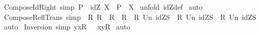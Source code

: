 \begin{isabellebody}
\isamarkupfalse%
%
\endisatagproof
{\isafoldproof}%
%
\isadelimproof
\isanewline
%
\endisadelimproof
\isanewline
\isanewline
{}\isamarkupfalse%
\ Compose{\isacharunderscore}Id{\isacharunderscore}Right\ {\isacharbrackleft}simp{\isacharbrackright}{\isacharcolon}\ {\isachardoublequoteopen}{\isacharparenleft}P\ {\isacharpercent}{\isacharsemicolon}\ idZ\ X{\isacharparenright}\ {\isacharequal}\ {\isacharparenleft}P\ {\isacharcolon}{\isachargreater}\ X{\isacharparenright}{\isachardoublequoteclose}\isanewline
%
\isadelimproof
%
\endisadelimproof
%
\isatagproof
{}\isamarkupfalse%
\ {\isacharparenleft}unfold\ idZ{\isacharunderscore}def{\isacharparenright}\isanewline
{}\isamarkupfalse%
\ auto\isanewline
{}\isamarkupfalse%
%
\endisatagproof
{\isafoldproof}%
%
\isadelimproof
\isanewline
%
\endisadelimproof
\isanewline
{}\isamarkupfalse%
\ Compose{\isacharunderscore}Refl{\isacharunderscore}Trans\ {\isacharbrackleft}simp{\isacharbrackright}{\isacharcolon}\ {\isachardoublequoteopen}{\isacharbang}{\isacharbang}\ R{\isachardot}\ {\isacharparenleft}R\ {\isacharpercent}{\isacharsemicolon}\ R{\isacharparenright}\ {\isacharless}{\isacharequal}\ R\ {\isacharequal}{\isacharequal}{\isachargreater}\ {\isacharparenleft}{\isacharparenleft}R\ Un\ idZ{\isacharparenleft}S{\isacharparenright}{\isacharparenright}\ {\isacharpercent}{\isacharsemicolon}\ {\isacharparenleft}R\ Un\ idZ{\isacharparenleft}S{\isacharparenright}{\isacharparenright}{\isacharparenright}\ {\isacharless}{\isacharequal}\ {\isacharparenleft}R\ Un\ idZ{\isacharparenleft}S{\isacharparenright}{\isacharparenright}{\isachardoublequoteclose}\isanewline
%
\isadelimproof
%
\endisadelimproof
%
\isatagproof
{}\isamarkupfalse%
\ auto\isanewline
{}\isamarkupfalse%
%
\endisatagproof
{\isafoldproof}%
%
\isadelimproof
%
\endisadelimproof
%
\isamarkuptrue%
\isamarkupfalse%
\ Inversion\ {\isacharbrackleft}simp{\isacharbrackright}{\isacharcolon}\ {\isachardoublequoteopen}{\isacharparenleft}y{\isacharcomma}x{\isacharparenright}{\isacharcolon}{\isacharparenleft}R\ {\isacharpercent}{\isachartilde}{\isacharparenright}\ {\isacharequal}\ {\isacharparenleft}{\isacharparenleft}x{\isacharcomma}y{\isacharparenright}{\isacharcolon}R{\isacharparenright}{\isachardoublequoteclose}\isanewline
%
\isadelimproof
%
\endisadelimproof
%
\isatagproof
{}\isamarkupfalse%
\ auto\isanewline
{}\isamarkupfalse%
%
\endisatagproof
{\isafoldproof}%

\end{isabellebody}
